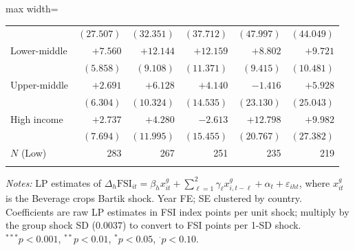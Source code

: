 \begin{table}[htbp]
\begin{adjustbox}{max width=\textwidth}
\begin{threeparttable}
\begin{tabular}{l rrrrr}
& $(27.507)$ & $(32.351)$ & $(37.712)$ & $(47.997)$ & $(44.049)$ \\[3pt]
Lower-middle & $+7.560$ & $+12.144$ & $+12.159$ & $+8.802$ & $+9.721$ \\
& $(5.858)$ & $(9.108)$ & $(11.371)$ & $(9.415)$ & $(10.481)$ \\[3pt]
Upper-middle & $+2.691$ & $+6.128$ & $+4.140$ & $-1.416$ & $+5.928$ \\
& $(6.304)$ & $(10.324)$ & $(14.535)$ & $(23.130)$ & $(25.043)$ \\[3pt]
High income & $+2.737$ & $+4.280$ & $-2.613$ & $+12.798$ & $+9.982$ \\
& $(7.694)$ & $(11.995)$ & $(15.455)$ & $(20.767)$ & $(27.382)$ \\[3pt]
\midrule
$N$ (Low) & 283 & 267 & 251 & 235 & 219 \\
\addlinespace
\bottomrule
\end{tabular}
\begin{tablenotes}\small
\item \textit{Notes:} LP estimates of $\Delta_h\text{FSI}_{it} = \beta_h x^g_{it} + \sum_{\ell=1}^{2}\gamma_\ell x^g_{i,t-\ell} + \alpha_t + \varepsilon_{iht}$, where $x^g_{it}$ is the Beverage crops Bartik shock. Year FE; SE clustered by country. Coefficients are raw LP estimates in FSI index points per unit shock; multiply by the group shock SD ($0.0037$) to convert to FSI points per 1-SD shock. $^{***}p<0.001$, $^{**}p<0.01$, $^{*}p<0.05$, $^{\cdot}p<0.10$.
\end{tablenotes}
\end{threeparttable}
\end{adjustbox}
\end{table}
